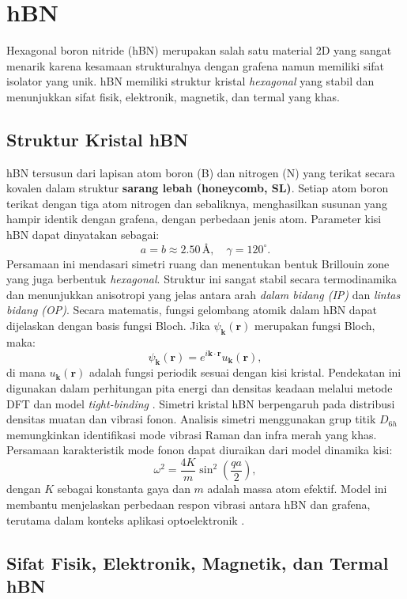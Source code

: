 \section{hBN}
Hexagonal boron nitride (hBN) merupakan salah satu material 2D yang sangat menarik karena kesamaan strukturalnya dengan grafena namun memiliki sifat isolator yang unik. hBN memiliki struktur kristal \emph{hexagonal} yang stabil dan menunjukkan sifat fisik, elektronik, magnetik, dan termal yang khas. \subsection{Struktur Kristal hBN}
hBN tersusun dari lapisan atom boron (B) dan nitrogen (N) yang terikat secara kovalen dalam struktur \textbf{sarang lebah (honeycomb, SL)}. Setiap atom boron terikat dengan tiga atom nitrogen dan sebaliknya, menghasilkan susunan yang hampir identik dengan grafena, dengan perbedaan jenis atom. Parameter kisi hBN dapat dinyatakan sebagai:
\[
a = b \approx 2.50 \, \text{\AA}, \quad \gamma = 120^\circ.
 \]
Persamaan ini mendasari simetri ruang dan menentukan bentuk Brillouin zone yang juga berbentuk \emph{hexagonal}. Struktur ini sangat stabil secara termodinamika dan menunjukkan anisotropi yang jelas antara arah \emph{dalam bidang (IP)} dan \emph{lintas bidang (OP)}. Secara matematis, fungsi gelombang atomik dalam hBN dapat dijelaskan dengan basis fungsi Bloch. Jika \(\psi_{\mathbf{k}}(\mathbf{r})\) merupakan fungsi Bloch, maka:
\begin{equation}
    \psi_{\mathbf{k}}(\mathbf{r}) = e^{i\mathbf{k}\cdot\mathbf{r}} u_{\mathbf{k}}(\mathbf{r}),
\end{equation}
di mana \(u_{\mathbf{k}}(\mathbf{r})\) adalah fungsi periodik sesuai dengan kisi kristal. Pendekatan ini digunakan dalam perhitungan pita energi dan densitas keadaan melalui metode DFT dan model \emph{tight-binding} \citep{CastroNeto2009}. Simetri kristal hBN berpengaruh pada distribusi densitas muatan dan vibrasi fonon. Analisis simetri menggunakan grup titik \(D_{6h}\) memungkinkan identifikasi mode vibrasi Raman dan infra merah yang khas. Persamaan karakteristik mode fonon dapat diuraikan dari model dinamika kisi:
\begin{equation}
    \omega^2 = \frac{4K}{m}\sin^2\left(\frac{qa}{2}\right),
\end{equation}
dengan \(K\) sebagai konstanta gaya dan \(m\) adalah massa atom efektif. Model ini membantu menjelaskan perbedaan respon vibrasi antara hBN dan grafena, terutama dalam konteks aplikasi optoelektronik \citep{Wang2017}. \subsection{Sifat Fisik, Elektronik, Magnetik, dan Termal hBN}
